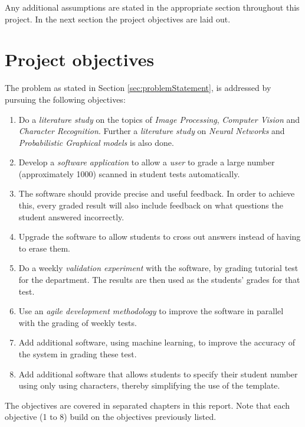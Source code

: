 Any additional assumptions are stated in the appropriate section throughout this project. In the next section the project objectives are laid out.


\section{Project objectives}
\label{sec:Objectives}

The problem as stated in Section \ref{sec:problemStatement}, is addressed by pursuing the following objectives:
\begin{enumerate}
  \item Do a \textsl{literature study} on the topics of \textsl{Image Processing}, \textsl{Computer Vision} and \textsl{Character Recognition}. Further a \textsl{literature study} on \textsl{Neural Networks} and \textsl{Probabilistic Graphical models} is also done.
  \item Develop a \textsl{software application} to allow a \textsl{user} to grade a large number (approximately 1000) scanned in student tests automatically.
\item The software should provide precise and useful feedback. In order to achieve this, every graded result will also include feedback on what questions the student answered incorrectly.
\item Upgrade the software to allow students to cross out answers instead of having to erase them.
  \item Do a weekly \textsl{validation experiment} with the software, by grading tutorial test for the department. The results are then used as the students' grades for that test.
  \item Use an \textsl{agile development methodology} to improve the software in parallel with the grading of weekly tests.
  \item Add additional software, using machine learning, to improve the accuracy of the system in grading these test.
  \item Add additional software that allows students to specify their student number using only using characters, thereby simplifying the use of the template.
\end{enumerate}

The objectives are covered in separated chapters in this report. Note that each objective (1 to 8) build on the objectives previously listed.


